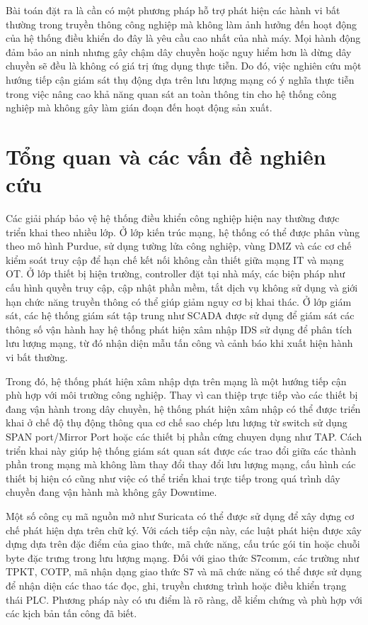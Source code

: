 \documentclass[../main.tex]{subfiles}
\begin{document}
Bài toán đặt ra là cần có một phương pháp hỗ trợ phát hiện các hành vi bất thường trong truyền thông công nghiệp mà không làm ảnh hưởng đến hoạt động của hệ thống điều khiển do đây là yêu cầu cao nhất của nhà máy. Mọi hành động đảm bảo an ninh nhưng gây chậm dây chuyền hoặc nguy hiểm hơn là dừng dây chuyền sẽ đều là không có giá trị ứng dụng thực tiễn. Do đó, việc nghiên cứu một hướng tiếp cận giám sát thụ động dựa trên lưu lượng mạng có ý nghĩa thực tiễn trong việc nâng cao khả năng quan sát an toàn thông tin cho hệ thống công nghiệp mà không gây làm gián đoạn đến hoạt động sản xuất.

\section{Tổng quan và các vấn đề nghiên cứu}
\label{sec:giaiphap}

Các giải pháp bảo vệ hệ thống điều khiển công nghiệp hiện nay thường được triển khai theo nhiều lớp. Ở lớp kiến trúc mạng, hệ thống có thể được phân vùng theo mô hình Purdue, sử dụng tường lửa công nghiệp, vùng DMZ và các cơ chế kiểm soát truy cập để hạn chế kết nối không cần thiết giữa mạng IT và mạng OT. Ở lớp thiết bị hiện trường, controller đặt tại nhà máy, các biện pháp như cấu hình quyền truy cập, cập nhật phần mềm, tắt dịch vụ không sử dụng và giới hạn chức năng truyền thông có thể giúp giảm nguy cơ bị khai thác. Ở lớp giám sát, các hệ thống giám sát tập trung như SCADA được sử dụng để giám sát các thông số vận hành hay hệ thống phát hiện xâm nhập IDS sử dụng để phân tích lưu lượng mạng, từ đó nhận diện mẫu tấn công và cảnh báo khi xuất hiện hành vi bất thường.

Trong đó, hệ thống phát hiện xâm nhập dựa trên mạng là một hướng tiếp cận phù hợp với môi trường công nghiệp. Thay vì can thiệp trực tiếp vào các thiết bị đang vận hành trong dây chuyền, hệ thống phát hiện xâm nhập có thể được triển khai ở chế độ thụ động thông qua cơ chế sao chép lưu lượng từ switch sử dụng SPAN port/Mirror Port hoặc các thiết bị phần cứng chuyen dụng như TAP. Cách triển khai này giúp hệ thống giám sát quan sát được các trao đổi giữa các thành phần trong mạng mà không làm thay đổi thay đổi lưu lượng mạng, cấu hình các thiết bị hiện có cũng như việc có thể triển khai trực tiếp trong quá trình dây chuyền đang vận hành mà không gây Downtime.

Một số công cụ mã nguồn mở như Suricata có thể được sử dụng để xây dựng cơ chế phát hiện dựa trên chữ ký. Với cách tiếp cận này, các luật phát hiện được xây dựng dựa trên đặc điểm của giao thức, mã chức năng, cấu trúc gói tin hoặc chuỗi byte đặc trưng trong lưu lượng mạng. Đối với giao thức S7comm, các trường như TPKT, COTP, mã nhận dạng giao thức S7 và mã chức năng có thể được sử dụng để nhận diện các thao tác đọc, ghi, truyền chương trình hoặc điều khiển trạng thái PLC. Phương pháp này có ưu điểm là rõ ràng, dễ kiểm chứng và phù hợp với các kịch bản tấn công đã biết.
\end{document}
